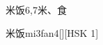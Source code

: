 \begin{entry}{米饭}{6,7}{⽶、⾷}
  \begin{phonetics}{米饭}{mi3fan4}[][HSK 1]
  \end{phonetics}
\end{entry}
